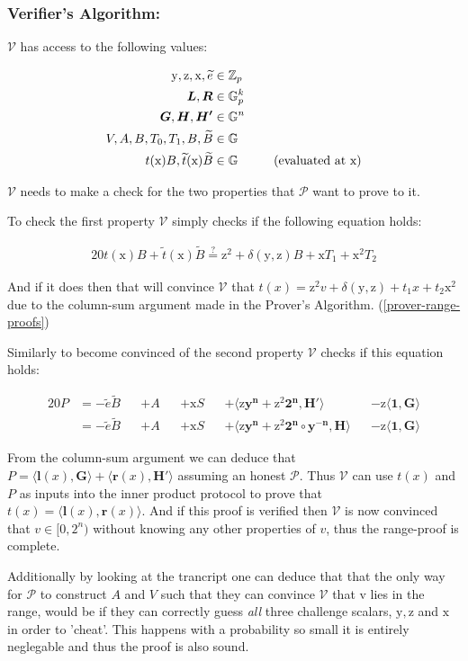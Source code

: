 \documentclass{article}
\newcommand{\eq}[1]{\begin{alignat*}{20}#1\end{alignat*}}
\newcommand{\eqn}[2]{\begin{equation}\label{#1}\begin{split}#2\end{split}\end{equation}}
\renewcommand{\vec}[1]{\boldsymbol{#1}}
\newcommand{\ran}[1]{\mathrm{#1}}
\newcommand{\vecran}[1]{\mathbf{#1}}
\newcommand{\V}{\mathcal{V}}
\renewcommand{\P}{\mathcal{P}}
\newcommand{\G}{\mathbb{G}}
\newcommand{\Z}{\mathbb{Z}}
\newcommand{\tB}{\widetilde{B}}
\renewcommand{\tt}{\widetilde{t}}
\newcommand{\dotp}[2]{\langle #1, #2 \rangle}
\begin{document}
\subsubsection{Verifier's Algorithm:} \label{verifier-range-proof}

$\V$ has access to the following values:

\eqn{def1-ver}{
	\ran{y}, \ran{z}, \ran{x}, \widetilde{e} &\in \Z_p \\
	\vec{L}, \vec{R} &\in \G_p^{k} \\
	\vec{G}, \vec{H}, \vec{H'} &\in \G^n \\
	V, A, B, T_0, T_1, B, \tB &\in \G \\
	t(\ran{x})B, \tt(\ran{x})\tB &\in \G \hspace*{1cm} \text{(evaluated at x)}
}

$\V$ needs to make a check for the two properties that $\P$ want to prove to it.

To check the first property $\V$ simply checks if the following equation holds:

\eq{
	t(\ran{x})B + \tt(\ran{x})\tB \stackrel{?}{=} \ran{z^2} + \delta(\ran{y},\ran{z})B + \ran{x}T_1 + \ran{x^2}T_2
}

And if it does then that will convince $\V$ that $t(x) = \ran{z^2}v + \delta(\ran{y},\ran{z}) + t_1x + t_2\ran{x^2}$ due to the column-sum argument made in the Prover's Algorithm. (\ref{prover-range-proofs})

Similarly to become convinced of the second property $\V$ checks if this equation holds:

\eq{
	P &= -\widetilde{e}\tB &&+ A &&+ \ran{x}S &&+ \dotp{\ran{z}\vecran{y^n} + \ran{z^2}\vec{2^n}}{\vec{H'}} &&- \ran{z}\dotp{\vec{1}}{\vec{\vec{G}}} \\
	&= -\widetilde{e}\tB &&+ A &&+ \ran{x}S &&+ \dotp{\ran{z}\vecran{y^n} + \ran{z^2}\vec{2^n}\circ\vecran{y^{-n}}}{\vec{H}} &&- \ran{z}\dotp{\vec{1}}{\vec{G}}
}

From the column-sum argument we can deduce that $P = \dotp{\vec{l}(x)}{\vec{G}} + \dotp{\vec{r}(x)}{\vec{H'}}$ assuming an honest $\P$. Thus $\V$ can use $t(x)$ and $P$ as inputs into the inner product protocol to prove that $ t(x) = \dotp{\vec{l}(x)}{\vec{r}(x)}$. And if this proof is verified then $\V$ is now convinced that $v\in [0,2^n)$ without knowing any other properties of $v$, thus the range-proof is complete.

Additionally by looking at the trancript one can deduce that that the only way for $\P$ to construct $A$ and $V$ such that they can convince $\V$ that v lies in the range, would be if they can correctly guess \textit{all} three challenge scalars, $\ran{y}, \ran{z}$ and $\ran{x}$ in order to 'cheat'. This happens with a probability so small it is entirely neglegable and thus the proof is also sound.
\end{document}
